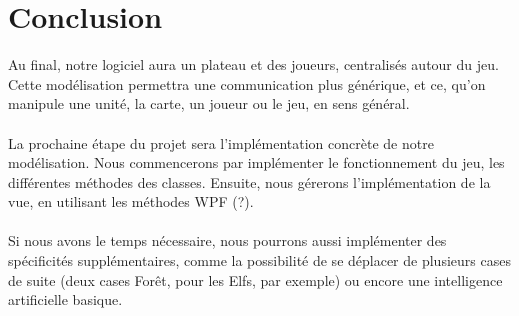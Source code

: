 \section{Conclusion}

Au final, notre logiciel aura un plateau et des joueurs, centralisés autour du jeu. Cette modélisation permettra une communication plus générique, et ce, qu'on manipule une unité, la carte, un joueur ou le jeu, en sens général.
\\\\
La prochaine étape du projet sera l'implémentation concrète de notre modélisation. Nous commencerons par implémenter le fonctionnement du jeu, les différentes méthodes des classes. Ensuite, nous gérerons l'implémentation de la vue, en utilisant les méthodes WPF (?).
\\\\
Si nous avons le temps nécessaire, nous pourrons aussi implémenter des spécificités supplémentaires, comme la possibilité de se déplacer de plusieurs cases de suite (deux cases Forêt, pour les Elfs, par exemple) ou encore une intelligence artificielle basique.